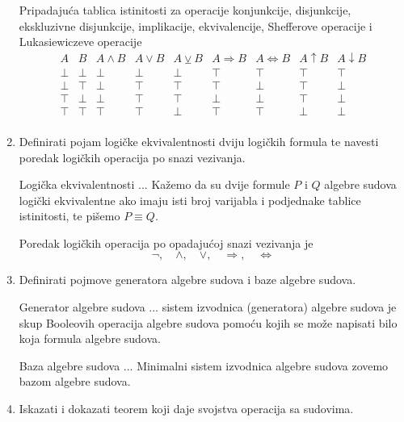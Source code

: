 \documentclass{article}
\begin{document}
\begin{enumerate}
Pripadajuća tablica istinitosti za operacije konjunkcije, disjunkcije, ekskluzivne disjunkcije, implikacije, ekvivalencije, Shefferove operacije i Lukasiewiczeve operacije
\begin{displaymath}
\begin{array}{|c|c|c|c|c|c|c|c|c|}
A & B & A\land B & A\lor B & A\veebar B & A\Rightarrow B & A\Leftrightarrow B & A\uparrow B & A\downarrow B\\
\hline
\bot & \bot & \bot & \bot & \bot & \top & \top & \top & \top\\
\bot & \top & \bot & \top & \top & \top & \bot & \top & \bot\\
\top & \bot & \bot & \top & \top & \bot & \bot & \top & \bot\\
\top & \top & \top & \top & \bot & \top & \top & \bot & \bot\\
\end{array}
\end{displaymath}


\item Definirati pojam logičke ekvivalentnosti dviju logičkih formula te navesti poredak logičkih operacija po snazi vezivanja.

Logička ekvivalentnosti ... Kažemo da su dvije formule $P$ i $Q$ algebre sudova logički ekvivalentne ako imaju isti broj varijabla i podjednake tablice istinitosti, te pišemo $P\equiv Q$.

Poredak logičkih operacija po opadajućoj snazi vezivanja je
$$\neg,\quad\land,\quad\lor,\quad\Rightarrow,\quad\Leftrightarrow$$

\item Definirati pojmove generatora algebre sudova i baze algebre sudova.

Generator algebre sudova ... sistem izvodnica (generatora) algebre sudova je skup Booleovih operacija algebre sudova pomoću kojih se može napisati bilo koja formula algebre sudova.

Baza algebre sudova ... Minimalni sistem izvodnica algebre sudova zovemo bazom algebre sudova.

\item Iskazati i dokazati teorem koji daje svojstva operacija sa sudovima.


\end{enumerate}
\end{document}
